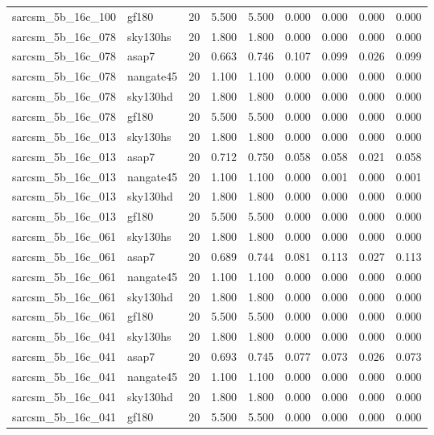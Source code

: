 \begin{tabular}{llrrrrrrr}
sarcsm\_5b\_16c\_100 & gf180 & 20 & 5.500 & 5.500 & 0.000 & 0.000 & 0.000 & 0.000 \\
sarcsm\_5b\_16c\_078 & sky130hs & 20 & 1.800 & 1.800 & 0.000 & 0.000 & 0.000 & 0.000 \\
sarcsm\_5b\_16c\_078 & asap7 & 20 & 0.663 & 0.746 & 0.107 & 0.099 & 0.026 & 0.099 \\
sarcsm\_5b\_16c\_078 & nangate45 & 20 & 1.100 & 1.100 & 0.000 & 0.000 & 0.000 & 0.000 \\
sarcsm\_5b\_16c\_078 & sky130hd & 20 & 1.800 & 1.800 & 0.000 & 0.000 & 0.000 & 0.000 \\
sarcsm\_5b\_16c\_078 & gf180 & 20 & 5.500 & 5.500 & 0.000 & 0.000 & 0.000 & 0.000 \\
sarcsm\_5b\_16c\_013 & sky130hs & 20 & 1.800 & 1.800 & 0.000 & 0.000 & 0.000 & 0.000 \\
sarcsm\_5b\_16c\_013 & asap7 & 20 & 0.712 & 0.750 & 0.058 & 0.058 & 0.021 & 0.058 \\
sarcsm\_5b\_16c\_013 & nangate45 & 20 & 1.100 & 1.100 & 0.000 & 0.001 & 0.000 & 0.001 \\
sarcsm\_5b\_16c\_013 & sky130hd & 20 & 1.800 & 1.800 & 0.000 & 0.000 & 0.000 & 0.000 \\
sarcsm\_5b\_16c\_013 & gf180 & 20 & 5.500 & 5.500 & 0.000 & 0.000 & 0.000 & 0.000 \\
sarcsm\_5b\_16c\_061 & sky130hs & 20 & 1.800 & 1.800 & 0.000 & 0.000 & 0.000 & 0.000 \\
sarcsm\_5b\_16c\_061 & asap7 & 20 & 0.689 & 0.744 & 0.081 & 0.113 & 0.027 & 0.113 \\
sarcsm\_5b\_16c\_061 & nangate45 & 20 & 1.100 & 1.100 & 0.000 & 0.000 & 0.000 & 0.000 \\
sarcsm\_5b\_16c\_061 & sky130hd & 20 & 1.800 & 1.800 & 0.000 & 0.000 & 0.000 & 0.000 \\
sarcsm\_5b\_16c\_061 & gf180 & 20 & 5.500 & 5.500 & 0.000 & 0.000 & 0.000 & 0.000 \\
sarcsm\_5b\_16c\_041 & sky130hs & 20 & 1.800 & 1.800 & 0.000 & 0.000 & 0.000 & 0.000 \\
sarcsm\_5b\_16c\_041 & asap7 & 20 & 0.693 & 0.745 & 0.077 & 0.073 & 0.026 & 0.073 \\
sarcsm\_5b\_16c\_041 & nangate45 & 20 & 1.100 & 1.100 & 0.000 & 0.000 & 0.000 & 0.000 \\
sarcsm\_5b\_16c\_041 & sky130hd & 20 & 1.800 & 1.800 & 0.000 & 0.000 & 0.000 & 0.000 \\
sarcsm\_5b\_16c\_041 & gf180 & 20 & 5.500 & 5.500 & 0.000 & 0.000 & 0.000 & 0.000 \\

\end{tabular}
